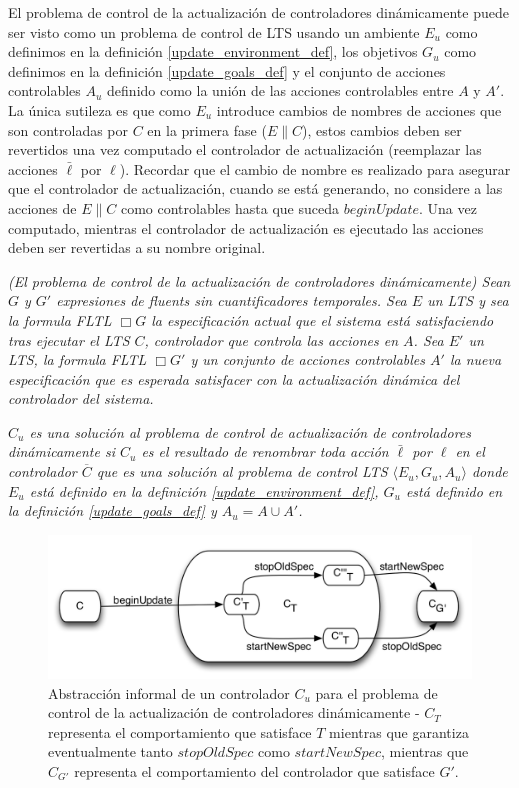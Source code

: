 El problema de control de la actualización de controladores dinámicamente puede ser visto como un problema de control de
LTS usando un ambiente $E_u$ como definimos en la definición \ref{update_environment_def}, los objetivos $G_u$ como
definimos en la definición \ref{update_goals_def} y el conjunto de acciones controlables $A_u$ definido como la unión de las
acciones controlables entre $A$ y $A'$. La única sutileza es que como $E_u$ introduce cambios de nombres de acciones que
son controladas por $C$ en la primera fase ($E\|C$), estos cambios deben ser revertidos una vez computado el controlador
de actualización (reemplazar las acciones $\bar{\ell}$ por $\ell$). Recordar que el cambio de nombre es realizado para
asegurar que el controlador de actualización, cuando se está generando, no considere a las acciones de $E\|C$ como
controlables hasta que suceda $beginUpdate$. Una vez computado, mientras el controlador de actualización es ejecutado
las acciones deben ser revertidas a su nombre original.

\begin{nahaDef}
\emph{(El problema de control de la actualización de controladores dinámicamente) Sean $G$ y $G'$ expresiones de fluents
sin cuantificadores temporales. Sea $E$ un LTS y sea la formula FLTL $\Box G$ la especificación actual que el sistema está
satisfaciendo tras ejecutar el LTS $C$, controlador que controla las acciones en $A$. Sea $E'$ un LTS, la formula FLTL
$\Box G'$ y un conjunto de acciones controlables $A'$ la nueva especificación que es esperada satisfacer con la
actualización dinámica del controlador del sistema.}

\emph{$C_u$ es una solución al problema de control de actualización de controladores dinámicamente si $C_u$ es el resultado de
renombrar toda acción $\bar{\ell}$ por $\ell$ en el controlador $\overline{C}$ que es una solución al problema de
control LTS $\langle E_u, G_u, A_u \rangle$ donde $E_u$ está definido en la definición \ref{update_environment_def},
$G_u$ está definido en la definición \ref{update_goals_def} y $A_u = A \cup A'$.}
\label{updating_controller_problem}
\end{nahaDef}

\begin{figure}
\centering
\includegraphics[scale=0.35]{img/C_u.png}
\caption{Abstracción informal de un controlador $C_u$ para el problema de control de la actualización de controladores
dinámicamente - $C_T$ representa el comportamiento que satisface $T$ mientras que garantiza eventualmente tanto
$stopOldSpec$ como $startNewSpec$, mientras que $C_{G'}$ representa el comportamiento del controlador que satisface
$G'$.}
\label{update_controller}
\end{figure}

